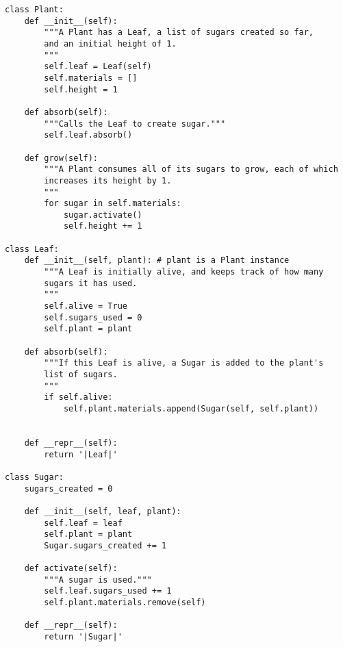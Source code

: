 \begin{solution}
\begin{lstlisting}
class Plant:
    def __init__(self):
        """A Plant has a Leaf, a list of sugars created so far,
        and an initial height of 1.
        """
        self.leaf = Leaf(self)
        self.materials = []
        self.height = 1

    def absorb(self):
        """Calls the Leaf to create sugar."""
        self.leaf.absorb()

    def grow(self):
        """A Plant consumes all of its sugars to grow, each of which
        increases its height by 1.
        """
        for sugar in self.materials:
            sugar.activate()
            self.height += 1

class Leaf:
    def __init__(self, plant): # plant is a Plant instance
        """A Leaf is initially alive, and keeps track of how many
        sugars it has used.
        """
        self.alive = True
        self.sugars_used = 0
        self.plant = plant

    def absorb(self):
        """If this Leaf is alive, a Sugar is added to the plant's
        list of sugars.
        """
        if self.alive:
            self.plant.materials.append(Sugar(self, self.plant))


    def __repr__(self):
        return '|Leaf|'

class Sugar:
    sugars_created = 0

    def __init__(self, leaf, plant):
        self.leaf = leaf
        self.plant = plant
        Sugar.sugars_created += 1

    def activate(self):
        """A sugar is used."""
        self.leaf.sugars_used += 1
        self.plant.materials.remove(self)

    def __repr__(self):
        return '|Sugar|'
\end{lstlisting}
\end{solution}
